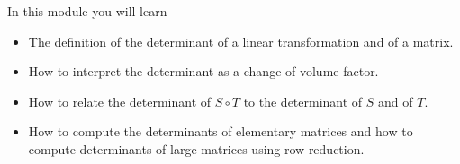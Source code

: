 \documentclass{workbook}
\begin{document}
\begin{module}\label{determinant module}

	In this module you will learn
	\begin{itemize}
		\item The definition of the determinant of a linear transformation and of a matrix.
		\item How to interpret the determinant as a change-of-volume factor.
		\item How to relate the determinant of $S\circ T$ to the determinant of $S$ and
			of $T$.
		\item How to compute the determinants of elementary matrices and how to compute determinants
			of large matrices using row reduction.
	\end{itemize}

	
	
\end{module}
\end{document}
